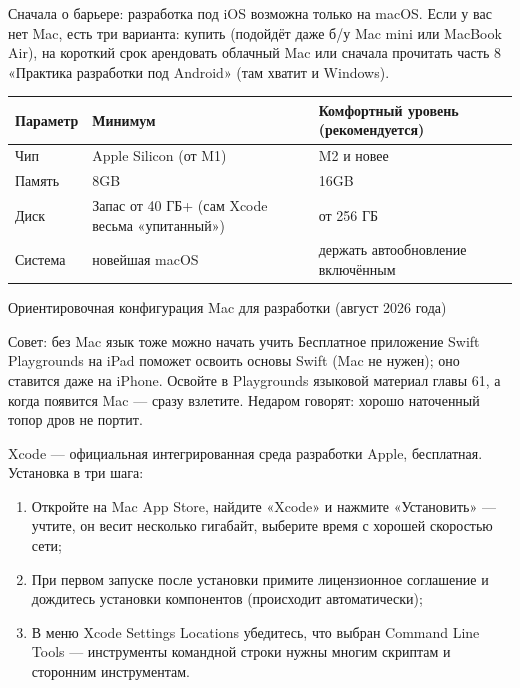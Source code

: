 


Сначала о барьере: разработка под iOS возможна только на macOS. Если у вас нет Mac, есть три варианта: купить (подойдёт даже б/у Mac mini или MacBook Air), на короткий срок арендовать облачный Mac или сначала прочитать часть 8 «Практика разработки под Android» (там хватит и Windows).

\begin{center}
\begin{tabularx}{\linewidth}{|X|X|X|}
\hline
\textbf{Параметр} & \textbf{Минимум} & \textbf{Комфортный уровень (рекомендуется)} \tabularnewline
\hline
Чип & Apple Silicon (от M1) & M2 и новее \tabularnewline
Память & 8GB & 16GB \tabularnewline
Диск & Запас от 40 ГБ+ (сам Xcode весьма «упитанный») & от 256 ГБ \tabularnewline
Система & новейшая macOS & держать автообновление включённым \tabularnewline
\hline
\end{tabularx}
\end{center}

\begin{center}\small\color{gray}Ориентировочная конфигурация Mac для разработки (август 2026 года)\end{center}

\begin{tcbinfo}{Совет: без Mac язык тоже можно начать учить}
Бесплатное приложение Swift Playgrounds на iPad поможет освоить основы Swift (Mac не нужен); оно ставится даже на iPhone. Освойте в Playgrounds языковой материал главы 61, а когда появится Mac — сразу взлетите. Недаром говорят: хорошо наточенный топор дров не портит.

\end{tcbinfo}


Xcode — официальная интегрированная среда разработки Apple, бесплатная. Установка в три шага:

\begin{enumerate}
  \item Откройте на Mac App Store, найдите «Xcode» и нажмите «Установить» — учтите, он весит несколько гигабайт, выберите время с хорошей скоростью сети;
  \item При первом запуске после установки примите лицензионное соглашение и дождитесь установки компонентов (происходит автоматически);
  \item В меню Xcode Settings Locations убедитесь, что выбран Command Line Tools — инструменты командной строки нужны многим скриптам и сторонним инструментам.
\end{enumerate}

